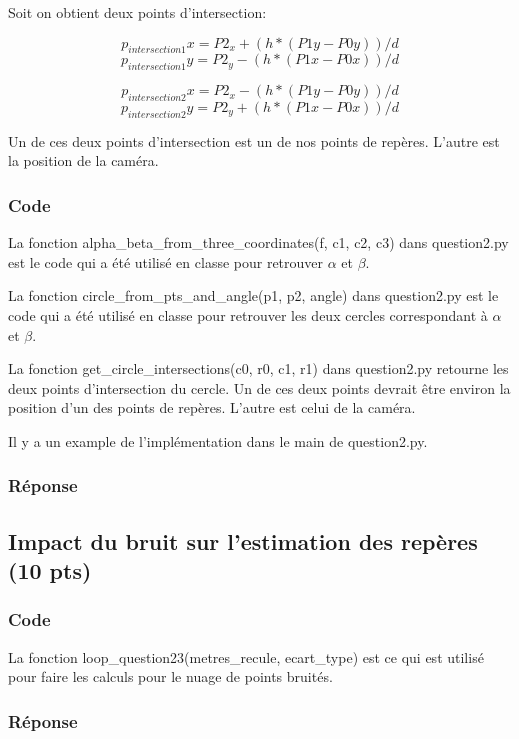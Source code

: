 \documentclass[12pt]{article}
\begin{document}
Soit on obtient deux points d'intersection:

\[  p_{intersection1}x = P2_x + (h*(P1y - P0y))/d \]
\[  p_{intersection1}y = P2_y - (h*(P1x - P0x))/d \]

\[  p_{intersection2}x = P2_x - (h*(P1y - P0y))/d \]
\[  p_{intersection2}y = P2_y + (h*(P1x - P0x))/d \]

Un de ces deux points d'intersection est un de nos points de rep\`eres.
L'autre est la position de la cam\'era.

\subsubsection{Code}
La fonction alpha\_beta\_from\_three\_coordinates(f, c1, c2, c3) dans question2.py est le code qui a été utilisé en classe pour retrouver $\alpha$ et $\beta$.

La fonction circle\_from\_pts\_and\_angle(p1, p2, angle) dans question2.py est le code qui a été utilisé en classe pour retrouver les deux cercles correspondant \`a $\alpha$ et $\beta$.

La fonction get\_circle\_intersections(c0, r0, c1, r1) dans question2.py retourne les deux points d'intersection du cercle.
Un de ces deux points devrait \^etre environ la position d'un des points de rep\`eres.
L'autre est celui de la cam\'era.

Il y a un example de l'impl\'ementation dans le main de question2.py.

\subsubsection{Réponse}

\subsection{Impact du bruit sur l'estimation des repères (10 pts)}
\subsubsection{Code}
La fonction loop\_question23(metres\_recule, ecart\_type) est ce qui est utilis\'e pour faire les calculs pour le nuage de points bruit\'es.

\subsubsection{Réponse}
\end{document}
